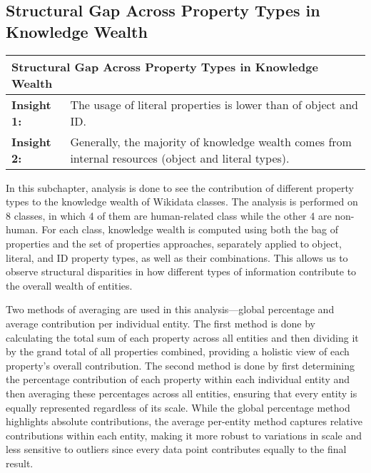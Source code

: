 \subsection{Structural Gap Across Property Types in Knowledge Wealth} \label{wealth & proptype contribution}

\begin{table}[h]
    \centering
    \renewcommand{\arraystretch}{1.3}
    \begin{tabular}{|l p{12cm}|} 
        \hline
        \multicolumn{2}{|l|}{\textbf{Structural Gap Across Property Types in Knowledge Wealth}} \\
        \hline
        \textbf{Insight 1:} & The usage of literal properties is lower than
        of object and ID.\\
        \textbf{Insight 2:} & Generally, the majority of knowledge wealth comes from internal resources (object and literal types). \\
        \hline
    \end{tabular}
\end{table}

In this subchapter, analysis is done to see the contribution of different property types to the knowledge wealth of Wikidata classes. The analysis is performed on 8 classes, in which 4 of them are human-related class while the other 4 are non-human. For each class, knowledge wealth is computed using both the bag of properties and the set of properties approaches, separately applied to object, literal, and ID property types, as well as their combinations. This allows us to observe structural disparities in how different types of information contribute to the overall wealth of entities.

Two methods of averaging are used in this analysis—global percentage and average contribution per individual entity. The first method is done by calculating the total sum of each property across all entities and then dividing it by the grand total of all properties combined, providing a holistic view of each property's overall contribution. The second method is done by first determining the percentage contribution of each property within each individual entity and then averaging these percentages across all entities, ensuring that every entity is equally represented regardless of its scale. While the global percentage method highlights absolute contributions, the average per-entity method captures relative contributions within each entity, making it more robust to variations in scale and less sensitive to outliers since every data point contributes equally to the final result.

